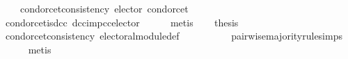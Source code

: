\begin{isabellebody}
\isanewline
\ \ \ \ {\isachardoublequoteopen}condorcet{\isacharunderscore}{\kern0pt}consistency\ {\isacharparenleft}{\kern0pt}elector\ condorcet{\isacharparenright}{\kern0pt}{\isachardoublequoteclose}\isanewline
\ \ \ \ \isamarkupfalse%
\ condorcet{\isacharunderscore}{\kern0pt}is{\isacharunderscore}{\kern0pt}dcc\ dcc{\isacharunderscore}{\kern0pt}imp{\isacharunderscore}{\kern0pt}cc{\isacharunderscore}{\kern0pt}elector\isanewline
\ \ \ \ \isamarkupfalse%
\ metis\isanewline
\ \ \isamarkupfalse%
\ {\isacharquery}{\kern0pt}thesis\isanewline
\ \ \ \ \isamarkupfalse%
\ condorcet{\isacharunderscore}{\kern0pt}consistency{}\ electoral{\isacharunderscore}{\kern0pt}module{\isacharunderscore}{\kern0pt}def\isanewline
\ \ \ \ \ \ \ \ \ \ pairwise{\isacharunderscore}{\kern0pt}majority{\isacharunderscore}{\kern0pt}rule{\isachardot}{\kern0pt}simps\isanewline
\ \ \ \ \isamarkupfalse%
\ metis\isanewline
{}\isamarkupfalse%
%
\endisatagproof
{\isafoldproof}%
%
\isadelimproof
\isanewline
%
\endisadelimproof
%
\isadelimtheory
\isanewline
%
\endisadelimtheory
%
\isatagtheory
{}\isamarkupfalse%
%
\endisatagtheory
{\isafoldtheory}%
%
\isadelimtheory
%
\endisadelimtheory
%
\end{isabellebody}%
\endinput
